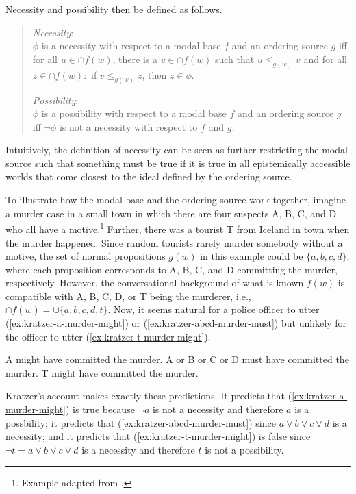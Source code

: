 Necessity and possibility then be defined as follows.
\begin{quote}
\noindent \textit{Necessity}: \\
$\phi$ is a necessity with respect to a modal base $f$ and an ordering source $g$ iff for all $u \in \cap f(w)$, there is a $v \in \cap f(w)$
such that $u \le_{g(w)} v$ and for all $z \in \cap f(w):$ if $v \le_{g(w)} z$, then $z \in \phi$.

\noindent \textit{Possibility}: \\
$\phi$ is a possibility with respect to a modal base $f$ and an ordering source $g$ iff $\lnot \phi$ is not a necessity with respect to $f$ and $g$.
\end{quote}
\noindent Intuitively, the definition of necessity can be seen as further restricting the modal source such that something must be true if it is true in 
all epistemically accessible worlds that come closest to the ideal defined by the ordering source. 

To illustrate how the modal base and the ordering source work together, imagine a murder case in a small town in which 
there are four suspects A, B, C, and D who all have a motive.\footnote{Example adapted from \textcite[][Ch. 2]{Kratzer2012}.} Further,
there was a tourist T from Iceland in town when the murder happened. Since random tourists rarely murder somebody without
a motive, the set of normal propositions $g(w)$ in this example could be $\{a, b, c, d\}$, where each proposition corresponds to
 A, B, C, and D committing the murder, respectively. 
However, the conversational background of what is known $f(w)$ is compatible with A, B, C, D, or T being the murderer,
i.e., $\cap f(w) = \cup \{a, b, c, d, t\}$. Now, it seems natural for a police officer to utter (\ref{ex:kratzer-a-murder-might})
or  (\ref{ex:kratzer-abcd-murder-must}) but unlikely for the officer to utter (\ref{ex:kratzer-t-murder-might}).

\begin{exe}
\ex \label{ex:kratzer-a-murder-might} A might have committed the murder.
\ex \label{ex:kratzer-abcd-murder-must} A or B or C or D must have committed the murder.
\ex \label{ex:kratzer-t-murder-might} T might have committed the murder.
\end{exe}

\noindent Kratzer's account makes exactly these predictions. It predicts that (\ref{ex:kratzer-a-murder-might}) is true because 
$\lnot a$ is not a necessity and therefore $a$ is a possbility; it predicts that (\ref{ex:kratzer-abcd-murder-must}) since 
$a \lor b \lor c \lor d$ is a necessity; and it  predicts that (\ref{ex:kratzer-t-murder-might}) is false since $\lnot t = a \lor b \lor c \lor d$ is a necessity
and therefore $t$ is not a possibility.

